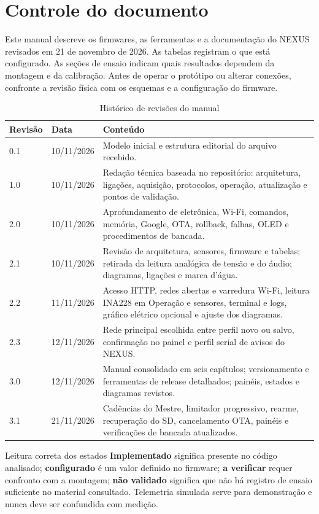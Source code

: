 \documentclass[11pt,a4paper,oneside]{report}
\begin{document}
\chapter*{Controle do documento}
Este manual descreve os firmwares, as ferramentas e a documentação do NEXUS revisados em 21 de novembro de 2026. As tabelas registram o que está configurado. As seções de ensaio indicam quais resultados dependem da montagem e da calibração. Antes de operar o protótipo ou alterar conexões, confronte a revisão física com os esquemas e a configuração do firmware.
\begin{table}[htbp]\centering
\caption{Histórico de revisões do manual}\label{tab:revisoes}
\begin{tabularx}{\textwidth}{@{}llX@{}}\toprule
Revisão & Data & Conteúdo\\\midrule
0.1 & 10/11/2026 & Modelo inicial e estrutura editorial do arquivo recebido.\\
1.0 & 10/11/2026 & Redação técnica baseada no repositório: arquitetura, ligações, aquisição, protocolos, operação, atualização e pontos de validação.\\
2.0 & 10/11/2026 & Aprofundamento de eletrônica, Wi-Fi, comandos, memória, Google, OTA, rollback, falhas, OLED e procedimentos de bancada.\\
2.1 & 10/11/2026 & Revisão de arquitetura, sensores, firmware e tabelas; retirada da leitura analógica de tensão e do áudio; diagramas, ligações e marca d'água.\\
2.2 & 11/11/2026 & Acesso HTTP, redes abertas e varredura Wi-Fi, leitura INA228 em Operação e sensores, terminal e logs, gráfico elétrico opcional e ajuste dos diagramas.\\
2.3 & 12/11/2026 & Rede principal escolhida entre perfil novo ou salvo, confirmação no painel e perfil serial de avisos do NEXUS.\\
3.0 & 12/11/2026 & Manual consolidado em seis capítulos; versionamento e ferramentas de release detalhados; painéis, estados e diagramas revistos.\\
3.1 & 21/11/2026 & Cadências do Mestre, limitador progressivo, rearme, recuperação do SD, cancelamento OTA, painéis e verificações de bancada atualizados.\\\bottomrule
\end{tabularx}\end{table}
\begin{nota}{Leitura correta dos estados}
\textbf{Implementado} significa presente no código analisado; \textbf{configurado} é um valor definido no firmware; \textbf{a verificar} requer confronto com a montagem; \textbf{não validado} significa que não há registro de ensaio suficiente no material consultado. Telemetria simulada serve para demonstração e nunca deve ser confundida com medição.
\end{nota}
\tableofcontents
\listoffigures{}
\listoftables{}
\end{document}
